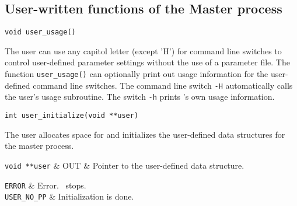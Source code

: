 
\subsection{User-written functions of the Master process}

\bd


\label{user_usage}
\begin{verbatim}
void user_usage()
\end{verbatim}

\bd

\describe

The user can use any capitol letter (except 'H') for command line
switches to control user-defined parameter settings without the use of
a parameter file. The function {\tt user\_usage()} can optionally
print out usage information for the user-defined command line
switches. The command line switch {\tt -H} automatically calls the
user's usage subroutine. The switch {\tt -h} prints
\BB's own usage information.

\ed

\vspace{1ex}

\begin{verbatim}
int user_initialize(void **user)
\end{verbatim}

\bd

\describe

The user allocates space for and initializes the user-defined
data structures for the master process.

\args

{\tt void **user} & OUT & Pointer to the user-defined data structure. \\
\et

\returns

{\tt ERROR} & Error. \BB\ stops. \\
{\tt USER\_NO\_PP} & Initialization is done. \\
\et


